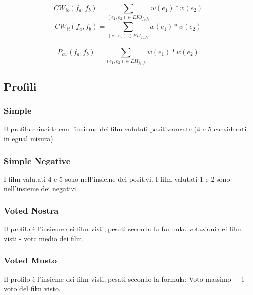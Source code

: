 \begin{equation}
CW_{io}(f_a,f_b) = \sum\limits_{(e_1,e_2) \in EIO_{f_a,f_b}^{}}^{}{w(e_1)*w(e_2)}
\end{equation}
\begin{equation}
CW_{ii}(f_a,f_b) = \sum\limits_{(e_1,e_2) \in EII_{f_a,f_b}^{}}^{}{w(e_1)*w(e_2)}
\end{equation}


\begin{equation}
P_{cw}(f_a,f_b) = \sum\limits_{(e_1,e_2) \in EII_{f_a,f_b}^{}}^{}{w(e_1)*w(e_2)}
\end{equation}

\subsection{Profili}

\subsubsection{Simple}
Il profilo coincide con l'insieme dei film valutati positivamente (4 e 5 considerati in egual misura)

\subsubsection{Simple Negative}

I film valutati 4 e 5 sono nell'insieme dei positivi. I film valutati 1 e 2 sono nell'insieme dei negativi.


\subsubsection{Voted Nostra}


Il profilo è l'insieme dei film visti, pesati secondo la formula:
votazioni dei film visti - voto medio dei film.

\subsubsection{Voted Musto}

Il profilo è l'insieme dei film visti, pesati secondo la formula:
Voto massimo + 1 - voto del film visto. 

